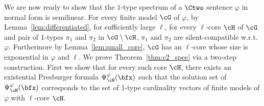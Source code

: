 We are now ready to show that the $1$-type spectrum of a $\Ctwo$ sentence $\varphi$ in normal form is semilinear.
For every finite model $\cG$ of $\varphi$,
by Lemma~\ref{lem:differentiated},
for sufficiently large $\ell$,
for every $\ell$-core $\cH$ of $\cG$
and pair of 1-types $\pi_1$ and $\pi_2$ in $\cG \setminus \cH$,
$\pi_1$ and $\pi_2$ are silent-compatible w.r.t. $\varphi$. 
Furthermore by Lemma~\ref{lem:small_core},
$\cG$ has an $\ell$-core whose size is exponential in $\varphi$ and $\ell$.
We prove Theorem~\ref{thm:c2_spec} via a two-step construction.
First we show that for every such core $\cH$,
there exists an existential Presburger formula $\Psi^\varphi_\cH(\bfx)$
such that the solution set of $\Psi^\varphi_\cH(\bfx)$ corresponds to the set of 1-type cardinality vectors of finite models of $\varphi$ with $\ell$-core $\cH$.

